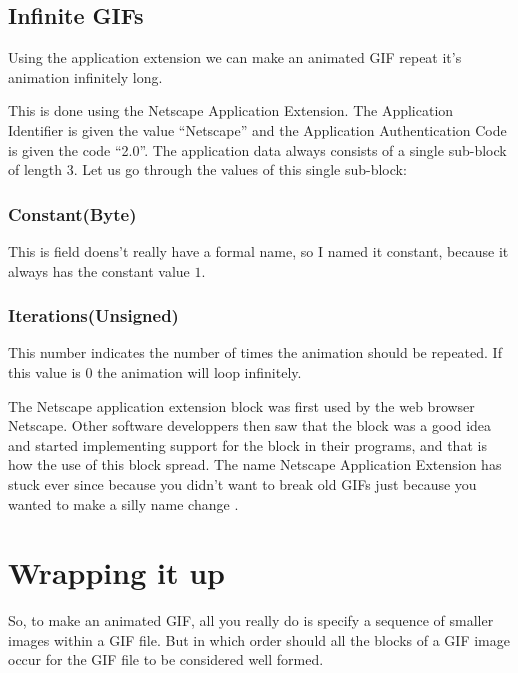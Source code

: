 \begin{refsection}
  \subsection{Infinite GIFs}

  Using the application extension we can make an animated GIF repeat
  it's animation infinitely long.

  This is done using the Netscape Application Extension. The
  Application Identifier is given the value ``Netscape'' and the
  Application Authentication Code is given the code ``2.0''. The
  application data always consists of a single sub-block of length
  3. Let us go through the values of this single sub-block:
  \cite{frazier97:_all_about_gif89}

  \subsubsection{Constant(Byte)}

  This is field doens't really have a formal name, so I named it
  constant, because it always has the constant value $1$.

  \subsubsection{Iterations(Unsigned)}

  This number indicates the number of times the animation should be
  repeated. If this value is $0$ the animation will loop infinitely.

  The Netscape application extension block was first used by the web
  browser Netscape. Other software developpers then saw that the block
  was a good idea and started implementing support for the block in
  their programs, and that is how the use of this block spread. The
  name Netscape Application Extension has stuck ever since because you
  didn't want to break old GIFs just because you wanted to make a
  silly name change \cite{walte96:_web_scrip_secret_weapon}.

  \section{Wrapping it up}

  So, to make an animated GIF, all you really do is specify a sequence
  of smaller images within a GIF file. But in which order should all
  the blocks of a GIF image occur for the GIF file to be considered
  well formed.

  \printbibliography[heading=subbibliography]

\end{refsection}
